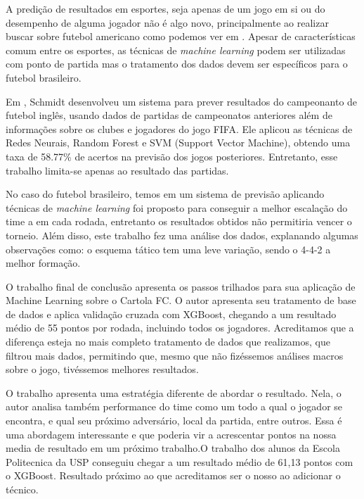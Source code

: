 \documentclass[conference]{IEEEtran}
\newcommand{\tit}[1]{{\textit{#1}}}
\begin{document}
A   predição   de   resultados   em   esportes,   seja   apenas   de
um   jogo  em   si   ou   do  desempenho   de   alguma  jogador   não
é   algo    novo,   principalmente    ao   realizar    buscar   sobre
futebol  americano  como  podemos  ver  em  \cite{sugar2015predicting}
\cite{porter2018predictive}                     \cite{lutz2015fantasy}
\cite{dolan2015machine}    \cite{becker2016analytical}.   Apesar    de
características comum entre os esportes, as técnicas de \tit{machine
learning} podem ser  utilizadas com ponto de partida  mas o tratamento
dos dados devem ser específicos para o futebol brasileiro.

Em \cite{schmidt2017uso},  Schmidt desenvolveu um sistema  para prever
resultados do campeonanto de futebol inglês, usando dados de partidas
de campeonatos  anteriores além  de informações  sobre os  clubes e
jogadores do  jogo FIFA.  Ele aplicou as  técnicas de  Redes Neurais,
Random  Forest e  SVM (Support  Vector Machine),  obtendo uma  taxa de
58.77\% de acertos na previsão dos jogos posteriores.
Entretanto, esse trabalho limita-se apenas ao resultado das partidas.

No caso  do futebol brasileiro, temos  em \cite{viscondiaplicaccao} um
sistema de previsão aplicando técnicas de \tit{machine learning} foi
proposto para conseguir a melhor escalação do time a em cada rodada,
entretanto  os resultados  obtidos não  permitiria vencer  o torneio.
Além  disso, este  trabalho fez  uma análise  dos dados,  explanando
algumas observações como: o esquema tático tem uma leve variação,
sendo o 4-4-2 a melhor formação.


O  trabalho final  de conclusão  \cite{henrique2018tcc} apresenta  os
passos  trilhados para  sua aplicação  de Machine  Learning sobre  o
Cartola FC. O autor apresenta seu tratamento de base de dados e aplica
validação cruzada com XGBoost, chegando  a um resultado médio de 55
pontos por  rodada, incluindo  todos os  jogadores. Acreditamos  que a
diferença esteja no mais completo tratamento de dados que realizamos,
que filtrou  mais dados,  permitindo que,  mesmo que  não fizéssemos
análises macros sobre o jogo, tivéssemos melhores resultados.

O trabalho  \cite{gomide2018} apresenta  uma estratégia  diferente de
abordar o resultado. Nela, o autor analisa também performance do time
como  um todo  a  qual o  jogador  se encontra,  e  qual seu  próximo
adversário, local  da partida,  entre outros.  Essa é  uma abordagem
interessante e que poderia vir a  acrescentar pontos na nossa media de
resultado  em um  próximo trabalho.O  trabalho dos  alunos da  Escola
Politecnica da  USP conseguiu  chegar a um  resultado médio  de 61,13
pontos  com o  XGBoost. Resultado  próximo ao  que acreditamos  ser o
nosso ao adicionar o técnico.
\end{document}
